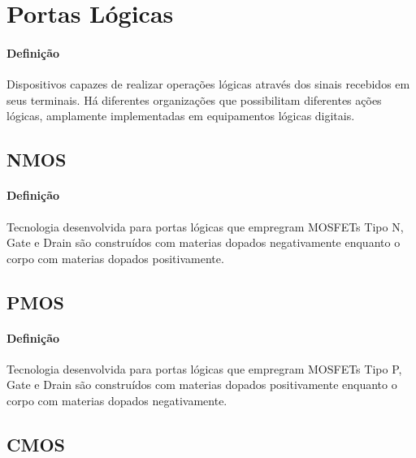 \documentclass{article}
\begin{document}
\newpage

    \section{Portas Lógicas}
        \paragraph{Definição}Dispositivos capazes de realizar operações lógicas através dos sinais recebidos em seus terminais. Há diferentes organizações que possibilitam diferentes ações lógicas, amplamente implementadas em equipamentos lógicas digitais.

        \subsection{NMOS}
            \paragraph{Definição}Tecnologia desenvolvida para portas lógicas que empregram MOSFETs Tipo N, Gate e Drain são construídos com materias dopados negativamente enquanto o corpo com materias dopados positivamente.

        \subsection{PMOS}
            \paragraph{Definição}Tecnologia desenvolvida para portas lógicas que empregram MOSFETs Tipo P, Gate e Drain são construídos com materias dopados positivamente enquanto o corpo com materias dopados negativamente.

        \subsection{CMOS}
\end{document}
